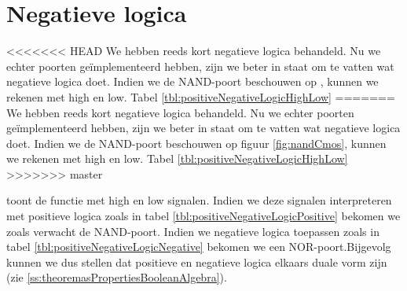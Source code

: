 \section{Negatieve logica}
\label{s:negativeLogic}
<<<<<<< HEAD
We hebben reeds kort negatieve logica behandeld. Nu we echter poorten ge\"implementeerd hebben, zijn we beter in staat om te vatten wat negatieve logica doet. Indien we de NAND-poort beschouwen op , kunnen we rekenen met high en low. Tabel \ref{tbl:positiveNegativeLogicHighLow}
=======
We hebben reeds kort negatieve logica behandeld. Nu we echter poorten ge\"implementeerd hebben, zijn we beter in staat om te vatten wat negatieve logica doet. Indien we de NAND-poort beschouwen op figuur \ref{fig:nandCmos}, kunnen we rekenen met high en low. Tabel \ref{tbl:positiveNegativeLogicHighLow}
>>>>>>> master
\begin{table}[hbt]
\centering
{}
\caption{Verschil tussen positieve en negatieve logica.}
\label{tbl:positiveNegativeLogic}
\end{table}
toont de functie met high en low signalen. Indien we deze signalen interpreteren met positieve logica zoals in tabel \ref{tbl:positiveNegativeLogicPositive} bekomen we zoals verwacht de NAND-poort. Indien we negatieve logica toepassen zoals in tabel \ref{tbl:positiveNegativeLogicNegative} bekomen we een NOR-poort.Bijgevolg kunnen we dus stellen dat positieve en negatieve logica elkaars duale vorm zijn (zie \ref{ss:theoremasPropertiesBooleanAlgebra}).
